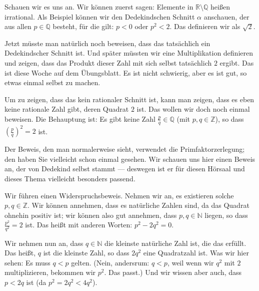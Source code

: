 \begin{spoken-clean}[00:30:51 - 00:32:12]
Schauen wir es uns an. Wir können zuerst sagen: Elemente in $\mathbb{R} \setminus \mathbb{Q}$ heißen irrational. Als Beispiel können wir den Dedekindschen Schnitt $\alpha$ anschauen, der aus allen $p \in \mathbb{Q}$ besteht, für die gilt: $p < 0$ oder $p^2 < 2$. Das definieren wir als $\sqrt{2}$.

Jetzt müsste man natürlich noch beweisen, dass das tatsächlich ein Dedekindscher Schnitt ist. Und später müssten wir eine Multiplikation definieren und zeigen, dass das Produkt dieser Zahl mit sich selbst tatsächlich $2$ ergibt. Das ist diese Woche auf dem Übungsblatt. Es ist nicht schwierig, aber es ist gut, so etwas einmal selbst zu machen.

Um zu zeigen, dass das kein rationaler Schnitt ist, kann man zeigen, dass es eben keine rationale Zahl gibt, deren Quadrat $2$ ist. Das wollen wir doch noch einmal beweisen. Die Behauptung ist: Es gibt keine Zahl $\frac{p}{q} \in \mathbb{Q}$ (mit $p, q \in \mathbb{Z}$), so dass $(\frac{p}{q})^2 = 2$ ist.
\end{spoken-clean}

\begin{spoken-clean}[00:32:12 - 00:34:33]
Der Beweis, den man normalerweise sieht, verwendet die Primfaktorzerlegung; den haben Sie vielleicht schon einmal gesehen. Wir schauen uns hier einen Beweis an, der von Dedekind selbst stammt --- deswegen ist er für diesen Hörsaal und dieses Thema vielleicht besonders passend.

Wir führen einen Widerspruchsbeweis. Nehmen wir an, es existieren solche $p, q \in \mathbb{Z}$. Wir können annehmen, dass es natürliche Zahlen sind, da das Quadrat ohnehin positiv ist; wir können also gut annehmen, dass $p, q \in \mathbb{N}$ liegen, so dass $\frac{p^2}{q^2} = 2$ ist. Das heißt mit anderen Worten: $p^2 - 2q^2 = 0$.

Wir nehmen nun an, dass $q \in \mathbb{N}$ die kleinste natürliche Zahl ist, die das erfüllt. Das heißt, $q$ ist die kleinste Zahl, so dass $2q^2$ eine Quadratzahl ist. Was wir hier sehen: Es muss $q < p$ gelten. (Nein, andersrum: $q < p$, weil wenn wir $q^2$ mit $2$ multiplizieren, bekommen wir $p^2$. Das passt.) Und wir wissen aber auch, dass $p < 2q$ ist (da $p^2 = 2q^2 < 4q^2$).
\end{spoken-clean}

